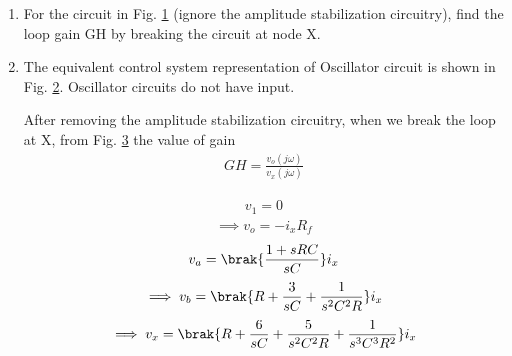 \begin{enumerate}[label=\arabic*.,ref=\theenumi]
\renewcommand{\thefigure}{\theenumi.\arabic{figure}}

\item For the circuit in Fig. \ref{fig:ee18btech11050_f1} (ignore the amplitude stabilization circuitry), find the loop gain GH by breaking the circuit at node X. 

\begin{figure}[!ht]
	\begin{center}
		\resizebox{\columnwidth}{!}{}
	\end{center}
\caption{}
\label{fig:ee18btech11050_f1}
\end{figure}

\item \solution
The equivalent control system representation of Oscillator circuit is shown in Fig. \ref{fig:ee18btech11050_f4}. Oscillator circuits do not have input.
\begin{figure}[!ht]
	\begin{center}
		\resizebox{\columnwidth}{!}{}
	\end{center}
\caption{}
\label{fig:ee18btech11050_f4}
\end{figure}
After removing the amplitude stabilization circuitry, when we break the loop at X, from Fig. \ref{fig:ee18btech11050_f2} the value of gain
\begin{align}
    GH = \frac{v_o(j\omega)}{v_x(j\omega)}
\end{align}

\begin{figure}[!ht]
	\begin{center}
		\resizebox{\columnwidth}{!}{}
	\end{center}
\caption{}
\label{fig:ee18btech11050_f2}
\end{figure}
\begin{align}
    v_1 = 0
\end{align}
\begin{align}
    \implies v_o = -i_xR_f
    \label{ee18btech11050_eq1}
\end{align}
\begin{align}
    v_a = \brak{\frac{1+sRC}{sC}}i_x
\end{align}
\begin{align}
    \implies v_b = \brak{R + \frac{3}{sC} + \frac{1}{s^2C^2R}}i_x
\end{align}
\begin{align}
    \implies v_x = \brak{R + \frac{6}{sC} + \frac{5}{s^2C^2R} + \frac{1}{s^3C^3R^2}}i_x
\end{align}


\end{enumerate}
